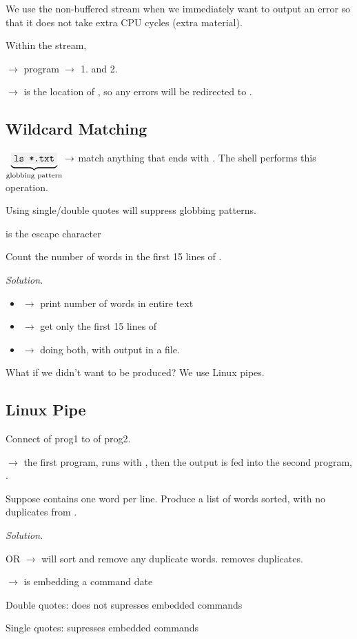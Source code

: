 We use the non-buffered stream when we immediately want to output an error
so that it does not take extra CPU cycles (extra material).

Within the stream,

 $ \rightarrow $ program $ \rightarrow $ 
1.  and 2. 

 $ \rightarrow $
 is the location of , so any errors will be redirected to
.

\subsection{Wildcard Matching}
$ \underbrace{\code{ls *.txt}}_{\text{globbing pattern}} \rightarrow $
match anything that ends with . The shell performs this operation.

Using single/double quotes will suppress globbing patterns.

\code{\textbackslash} is the escape character


Count the number of words in the first 15 lines of .

\emph{Solution.}

\begin{itemize}
    \item {} $ \rightarrow $ print number of words in entire text
    \item {} $ \rightarrow $ get only the first 15 lines
    of 
    \item {} $ \rightarrow $
    doing both, with output in a  file.
\end{itemize}

What if we didn't want  to be produced? We use Linux pipes.

\subsection{Linux Pipe}
Connect  of prog1 to  of prog2.

 $ \rightarrow $
the first program,  runs with , then the output is fed into
the second program, .


Suppose  contains one word per line. Produce
a list of words sorted, with no duplicates from .

\emph{Solution.}

 OR 
 $ \rightarrow $  will sort
and remove any duplicate words.  removes duplicates.

 $ \rightarrow $
 is embedding a command date

Double quotes: does not supresses embedded commands

Single quotes: supresses embedded commands